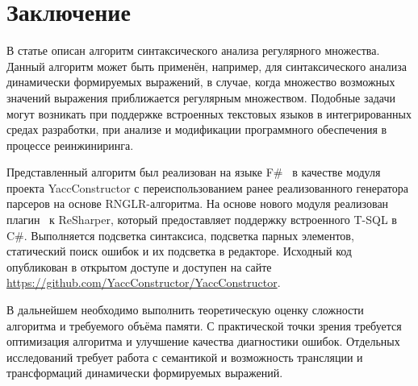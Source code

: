 \clearpage

\section*{Заключение}
В статье описан алгоритм синтаксического анализа регулярного множества. Данный алгоритм может быть применён, например, для синтаксического анализа динамически формируемых выражений, в случае, 
когда множество возможных значений выражения приближается регулярным множеством. Подобные задачи могут возникать при поддержке встроенных текстовых языков в интегрированных средах разработки, 
при анализе и модификации программного обеспечения в процессе реинжиниринга. 

Представленный алгоритм был реализован на языке F\#~\cite{FSharp} в качестве модуля проекта YaccConstructor с переиспользованием ранее реализованного генератора парсеров на основе RNGLR-алгоритма. 
На основе нового модуля реализован плагин~\cite{SECR14} к ReSharper, который предоставляет поддержку встроенного T-SQL в C\#. Выполняется подсветка синтаксиса, подсветка парных элементов,  статический поиск 
ошибок и их подсветка в редакторе. Исходный код опубликован в открытом доступе и доступен на сайте \url{https://github.com/YaccConstructor/YaccConstructor}.

В дальнейшем необходимо выполнить теоретическую оценку сложности алгоритма и требуемого объёма памяти. С практической точки зрения требуется оптимизация алгоритма и улучшение качества диагностики ошибок. 
Отдельных исследований требует  работа с семантикой и возможность трансляции и трансформаций динамически формируемых выражений.                                                                                                                                                                                                                                                                                              
